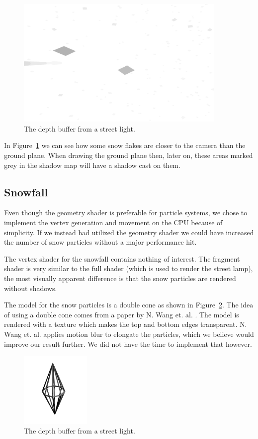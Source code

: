\documentclass[a4paper,12pt]{article}
\begin{document}
\begin{figure}[ht]
  \centering
  \includegraphics[width=0.9\textwidth]{fbo}
  \caption{\label{fig:fbo-image} The depth buffer from a street light.}
\end{figure}

In Figure~\ref{fig:fbo-image} we can see how some snow flakes are closer to the camera than the ground plane. When drawing the ground plane then, later on, these areas marked grey in the shadow map will have a shadow cast on them.

\subsection{Snowfall}
Even though the geometry shader is preferable for particle systems, we chose to implement the vertex generation and movement on the CPU because of simplicity. If we instead had utilized the geometry shader we could have increased the number of snow particles without a major performance hit.

The vertex shader for the snowfall contains nothing of interest. The fragment shader is very similar to the full shader (which is used to render the street lamp), the most visually apparent difference is that the snow particles are rendered without shadows.

The model for the snow particles is a double cone as shown in Figure~\ref{fig:dcone-image}. The idea of using a double cone comes from a paper by N. Wang et. al. \cite{snow-rain}. The model is rendered with a texture which makes the top and bottom edges transparent. N. Wang et. al. applies motion blur to elongate the particles, which we believe would improve our result further. We did not have the time to implement that however.
\begin{figure}[H]
  \centering
  \includegraphics[width=0.3\textwidth]{dcone}
  \caption{\label{fig:dcone-image} The depth buffer from a street light.}
\end{figure}
\end{document}
